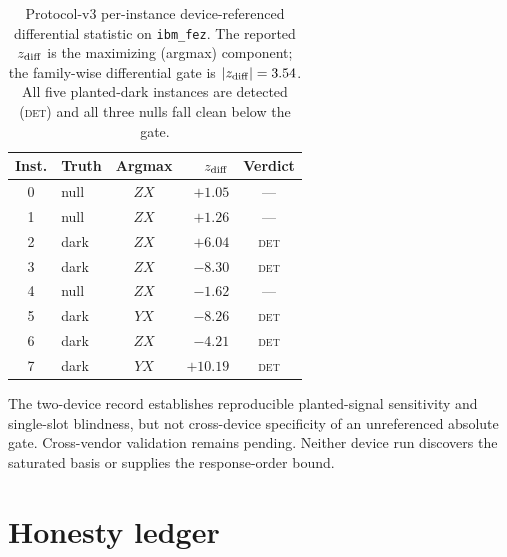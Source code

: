 \documentclass[aps,prl,reprint,superscriptaddress,nofootinbib]{revtex4-2}
\begin{document}
\begin{table}[t]
\caption{Protocol-v3 per-instance device-referenced differential statistic on \texttt{ibm\_fez}.  The reported $z_{\rm diff}$ is the maximizing (argmax) component; the family-wise differential gate is $|z_{\rm diff}|=3.54$.  All five planted-dark instances are detected (\textsc{det}) and all three nulls fall clean below the gate.}
\label{tab:fez-v3}
\scriptsize
\begin{ruledtabular}
\begin{tabular}{clcrc}
Inst. & Truth & Argmax & $z_{\rm diff}$ & Verdict\\
\hline
0 & null & $ZX$ & $+1.05$ & ---\\
1 & null & $ZX$ & $+1.26$ & ---\\
2 & dark & $ZX$ & $+6.04$ & \textsc{det}\\
3 & dark & $ZX$ & $-8.30$ & \textsc{det}\\
4 & null & $ZX$ & $-1.62$ & ---\\
5 & dark & $YX$ & $-8.26$ & \textsc{det}\\
6 & dark & $ZX$ & $-4.21$ & \textsc{det}\\
7 & dark & $YX$ & $+10.19$ & \textsc{det}\\
\end{tabular}
\end{ruledtabular}
\end{table}

The two-device record establishes reproducible planted-signal sensitivity and single-slot blindness, but not cross-device specificity of an unreferenced absolute gate.  Cross-vendor validation remains pending.  Neither device run discovers the saturated basis or supplies the response-order bound.

\section{Honesty ledger}
\label{sec:honesty}
\end{document}
